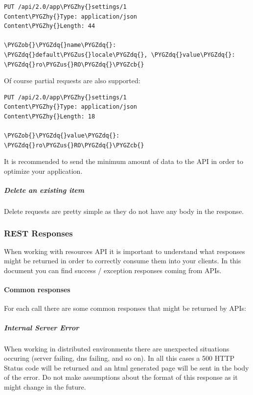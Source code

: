 \documentclass[letterpaper,10pt,english]{sphinxmanual}
\def\PYGZus{\char`\_}
\def\PYGZob{\char`\{}
\def\PYGZcb{\char`\}}
\def\PYGZhy{\char`\-}
\def\PYGZdq{\char`\"}
\begin{document}
\begin{Verbatim}[commandchars=\\\{\}]
PUT /api/2.0/app\PYGZhy{}settings/1
Content\PYGZhy{}Type: application/json
Content\PYGZhy{}Length: 44

\PYGZob{}\PYGZdq{}name\PYGZdq{}: \PYGZdq{}default\PYGZus{}locale\PYGZdq{}, \PYGZdq{}value\PYGZdq{}: \PYGZdq{}ro\PYGZus{}RO\PYGZdq{}\PYGZcb{}
\end{Verbatim}

Of course partial requests are also supported:

\begin{Verbatim}[commandchars=\\\{\}]
PUT /api/2.0/app\PYGZhy{}settings/1
Content\PYGZhy{}Type: application/json
Content\PYGZhy{}Length: 18

\PYGZob{}\PYGZdq{}value\PYGZdq{}: \PYGZdq{}ro\PYGZus{}RO\PYGZdq{}\PYGZcb{}
\end{Verbatim}

It is recommended to send the minimum amount of data to the API in order to optimize your application.


\subparagraph{Delete an existing item}
\label{features/roa/rest_standard:delete-an-existing-item}
Delete requests are pretty simple as they do not have any body in the response.


\subsubsection{REST Responses}
\label{features/roa/rest_responses::doc}\label{features/roa/rest_responses:rest-responses}
When working with resources API it is important to understand what responses might be returned in order to correctly consume
them into your clients. In this document you can find success / exception responses coming from APIs.


\paragraph{Common responses}
\label{features/roa/rest_responses:common-responses}
For each call there are some common responses that might be returned by APIs:


\subparagraph{Internal Server Error}
\label{features/roa/rest_responses:internal-server-error}
When working in distributed environments there are unexpected situations occuring (server failing, dns failing, and so on). In
all this cases a 500 HTTP Status code will be returned and an html generated page will be sent in the body of the error. Do
not make assumptions about the format of this response as it might change in the future.
\end{document}
